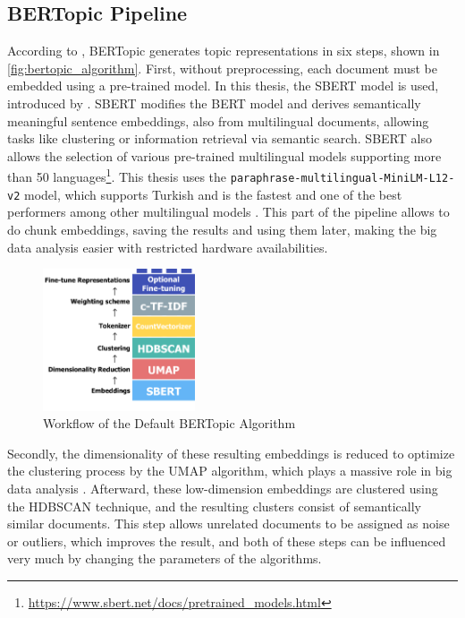 \subsection{BERTopic Pipeline}\label{chapter:bertopic_pipeline}

According to \textcite{bertopic}, BERTopic generates topic representations in six steps,
shown in \autoref{fig:bertopic_algorithm}. 
First, without preprocessing, each document must be embedded using a pre-trained model. 
In this thesis, the SBERT model is used, introduced by \textcite{sentence-bert}. 
SBERT modifies the BERT model and derives semantically meaningful sentence embeddings, 
also from multilingual documents, allowing tasks like clustering or information retrieval 
via semantic search. SBERT also allows the selection of various pre-trained multilingual 
models supporting more than 50 languages\footnote{\url{https://www.sbert.net/docs/pretrained_models.html}}. 
This thesis uses the \texttt{paraphrase-multilingual-MiniLM-L12-v2} model, which supports 
Turkish and is the fastest and one of the best performers among other multilingual models 
\parencite{reimers_sbert_multilingual_2020}. This part of the pipeline allows to do 
chunk embeddings, saving the results and using them later, making the big data analysis 
easier with restricted hardware availabilities.

\begin{figure}
    \centering
    \includegraphics[width=0.4\textwidth]{figures/bertopic_algorithm.png}
    \caption[Workflow of the Default BERTopic Algorithm]
    {Workflow of the Default BERTopic Algorithm\footnotemark}\label{fig:bertopic_algorithm}
\end{figure}

Secondly, the dimensionality of these resulting embeddings is reduced to optimize the 
clustering process by the \ac{UMAP} algorithm, 
which plays a massive role in big data analysis \parencite{mcinnes_umap_2020}. 
Afterward, these low-dimension embeddings are clustered using the \ac{HDBSCAN} technique, and the resulting 
clusters consist of semantically similar documents. This step allows unrelated documents 
to be assigned as noise or outliers, which improves the result, and both of these 
steps can be influenced very much by changing the parameters of the algorithms.

